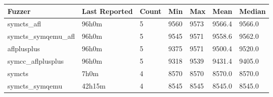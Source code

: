 
\begin{table*}[h]
\centering
\begin{tabular}{|l|l|l|l|l|l|l|}
\hline
\textbf{Fuzzer} & \textbf{Last Reported} & \textbf{Count} & \textbf{Min} & \textbf{Max} & \textbf{Mean} & \textbf{Median} \\
\hline
symcts\_afl        & 96h0m              & 5      & 9560  & 9573  & 9566.4        & 9566.0     \\
symcts\_symqemu\_afl & 96h0m              & 5      & 9545  & 9571  & 9558.6        & 9562.0     \\
aflplusplus        & 96h0m              & 5      & 9375  & 9571  & 9500.4        & 9520.0     \\
symcc\_aflplusplus & 96h0m              & 5      & 9318  & 9539  & 9431.4        & 9405.0     \\
symcts             & 7h0m               & 4      & 8570  & 8570  & 8570.0        & 8570.0     \\
symcts\_symqemu    & 42h15m             & 4      & 8545  & 8545  & 8545.0        & 8545.0     \\
\hline
\end{tabular}
\end{table*}